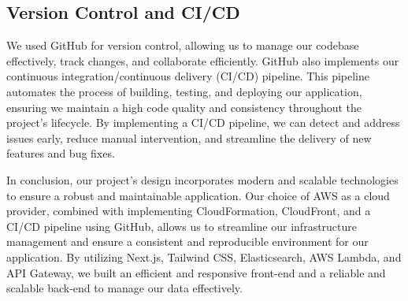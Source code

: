 \subsection{Version Control and CI/CD}

We used GitHub for version control, allowing us to manage our codebase effectively, track changes, and collaborate efficiently. GitHub also implements our continuous integration/continuous delivery (CI/CD) pipeline. This pipeline automates the process of building, testing, and deploying our application, ensuring we maintain a high code quality and consistency throughout the project's lifecycle. By implementing a CI/CD pipeline, we can detect and address issues early, reduce manual intervention, and streamline the delivery of new features and bug fixes. 

In conclusion, our project's design incorporates modern and scalable technologies to ensure a robust and maintainable application. Our choice of AWS as a cloud provider, combined with implementing CloudFormation, CloudFront, and a CI/CD pipeline using GitHub, allows us to streamline our infrastructure management and ensure a consistent and reproducible environment for our application. By utilizing Next.js, Tailwind CSS, Elasticsearch, AWS Lambda, and API Gateway, we built an efficient and responsive front-end and a reliable and scalable back-end to manage our data effectively. 